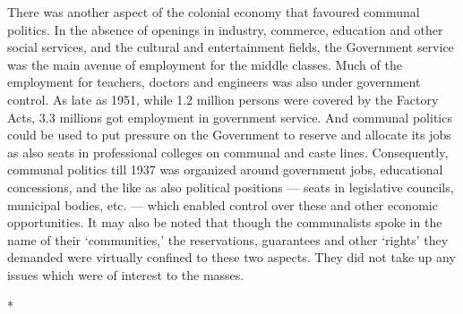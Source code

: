 \begin{multicols}{2}
There was another aspect of the colonial economy that favoured communal politics. In the absence of openings in industry, commerce, education and other social services, and the cultural and entertainment fields, the Government service was the main avenue of employment for the middle classes. Much of the employment for teachers, doctors and engineers was also under government control. As late as 1951, while 1.2 million persons were covered by the Factory Acts, 3.3 millions got employment in government service. And communal politics could be used to put pressure on the Government to reserve and allocate its jobs as also seats in professional colleges on communal and caste lines. Consequently, communal politics till 1937 was organized around government jobs, educational concessions, and the like as also political positions --- seats in legislative councils, municipal bodies, etc. --- which enabled control over these and other economic opportunities. It may also be noted that though the communalists spoke in the name of their `communities,' the reservations, guarantees and other `rights' they demanded were virtually confined to these two aspects. They did not take up any issues which were of interest to the masses.

\begin{center}*\end{center}

\paragraph*{}


\end{multicols}
